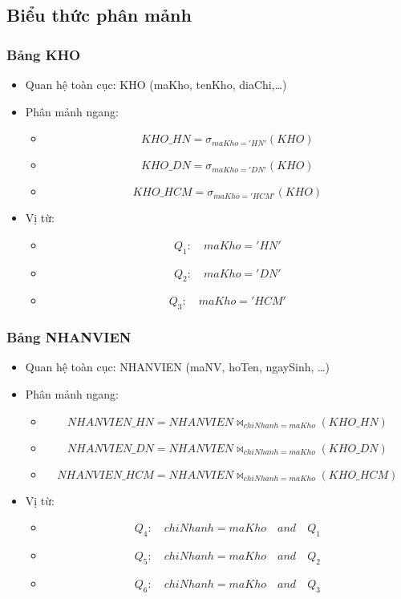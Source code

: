 \documentclass[a4paper,12pt]{report}
\begin{document}
\subsection{Biểu thức phân mảnh}
\subsubsection{Bảng KHO}
\begin{itemize}
    \item Quan hệ toàn cục: KHO (maKho, tenKho, diaChi,…)
    \item Phân mảnh ngang:
        \begin{itemize}[label=]
            \item \[KHO\_HN = \sigma_{maKho = 'HN'}(KHO)\]
            \item \[KHO\_DN = \sigma_{maKho = 'DN'}(KHO)\]
            \item \[KHO\_HCM = \sigma_{maKho = 'HCM'}(KHO)\]
        \end{itemize}
    \item Vị từ:
        \begin{itemize}[label=]
        \item \[Q_1\colon\quad maKho = 'HN'\]
        \item \[Q_2\colon\quad maKho = 'DN' \]
        \item \[Q_3\colon\quad maKho = 'HCM'\]
    \end{itemize}
\end{itemize}
\subsubsection{Bảng NHANVIEN}
\begin{itemize}
    \item Quan hệ toàn cục: NHANVIEN (maNV, hoTen, ngaySinh, \ldots)
    \item Phân mảnh ngang:
        \begin{itemize}[label=]
            \item \[NHANVIEN\_HN = NHANVIEN \bowtie_{chiNhanh = maKho}(KHO\_HN)\]
            \item \[NHANVIEN\_DN = NHANVIEN \bowtie_{chiNhanh = maKho}(KHO\_DN)\]
            \item \[NHANVIEN\_HCM = NHANVIEN \bowtie_{chiNhanh = maKho}(KHO\_HCM)\]
        \end{itemize}
    \item Vị từ:
    \begin{itemize}[label=]
        \item \[Q_4\colon\quad chiNhanh = maKho \quad and \quad Q_1\]
        \item \[Q_5\colon\quad chiNhanh = maKho \quad and \quad Q_2 \]
        \item \[Q_6\colon\quad chiNhanh = maKho \quad and \quad Q_3\]
    \end{itemize}
\end{itemize}
\end{document}
